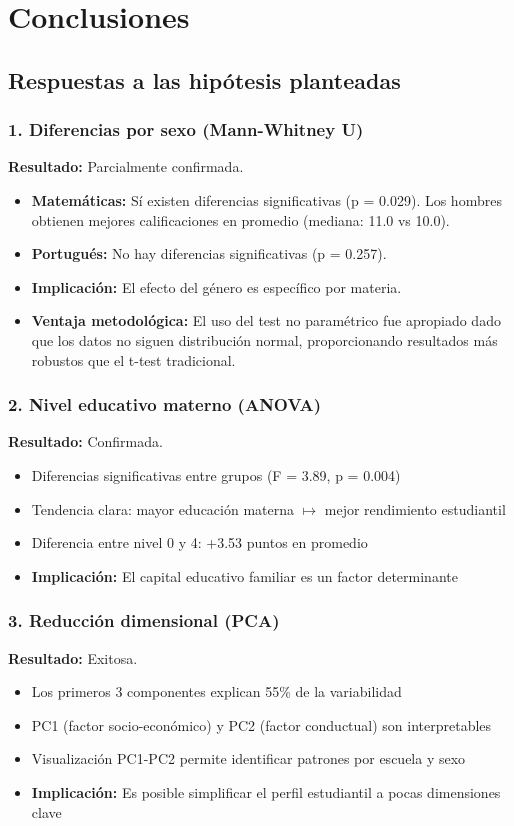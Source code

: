 \documentclass[a4paper,12pt]{article}
\begin{document}
\section{Conclusiones}

\subsection{Respuestas a las hipótesis planteadas}

\subsubsection{1. Diferencias por sexo (Mann-Whitney U)}
\textbf{Resultado:} Parcialmente confirmada.
\begin{itemize}
    \item \textbf{Matemáticas:} Sí existen diferencias significativas (p = 0.029). Los hombres obtienen mejores calificaciones en promedio (mediana: 11.0 vs 10.0).
    \item \textbf{Portugués:} No hay diferencias significativas (p = 0.257).
    \item \textbf{Implicación:} El efecto del género es específico por materia.
    \item \textbf{Ventaja metodológica:} El uso del test no paramétrico fue apropiado dado que los datos no siguen distribución normal, proporcionando resultados más robustos que el t-test tradicional.
\end{itemize}

\subsubsection{2. Nivel educativo materno (ANOVA)}
\textbf{Resultado:} Confirmada.
\begin{itemize}
    \item Diferencias significativas entre grupos (F = 3.89, p = 0.004)
    \item Tendencia clara: mayor educación materna $\longmapsto$ mejor rendimiento estudiantil
    \item Diferencia entre nivel 0 y 4: +3.53 puntos en promedio
    \item \textbf{Implicación:} El capital educativo familiar es un factor determinante
\end{itemize}

\subsubsection{3. Reducción dimensional (PCA)}
\textbf{Resultado:} Exitosa.
\begin{itemize}
    \item Los primeros 3 componentes explican 55\% de la variabilidad
    \item PC1 (factor socio-económico) y PC2 (factor conductual) son interpretables
    \item Visualización PC1-PC2 permite identificar patrones por escuela y sexo
    \item \textbf{Implicación:} Es posible simplificar el perfil estudiantil a pocas dimensiones clave
\end{itemize}
\end{document}
